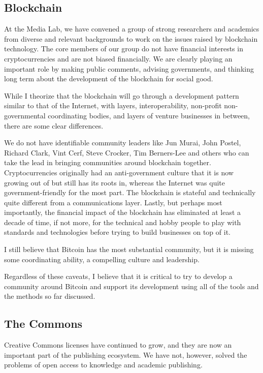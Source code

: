 \subsection{Blockchain}

At the Media Lab, we have convened a group of strong researchers and academics from diverse and relevant backgrounds to work on the issues raised by blockchain technology. The core members of our group do not have financial interests in cryptocurrencies and are not biased financially. We are clearly playing an important role by making public comments, advising governments, and thinking long term about the development of the blockchain for social good.

While I theorize that the blockchain will go through a development pattern similar to that of the Internet, with layers, interoperability, non-profit non-governmental coordinating bodies, and layers of venture businesses in between, there are some clear differences.

We do not have identifiable community leaders like Jun Murai, John Postel, Richard Clark, Vint Cerf, Steve Crocker, Tim Berners-Lee and others who can take the lead in bringing communities around blockchain together. Cryptocurrencies originally had an anti-government culture that it is now growing out of but still has its roots in, whereas the Internet was quite government-friendly for the most part. The blockchain is stateful and technically quite different from a communications layer. Lastly, but perhaps most importantly, the financial impact of the blockchain has eliminated at least a decade of time, if not more, for the technical and hobby people to play with standards and technologies before trying to build businesses on top of it.

I still believe that Bitcoin has the most substantial community, but it is missing some coordinating ability, a compelling culture and leadership.

Regardless of these caveats, I believe that it is critical to try to develop a community around Bitcoin and support its development using all of the tools and the methods so far discussed.

\subsection{The Commons}

Creative Commons licenses have continued to grow, and they are now an important part of the publishing ecosystem. We have not, however, solved the problems of open access to knowledge and academic publishing.

